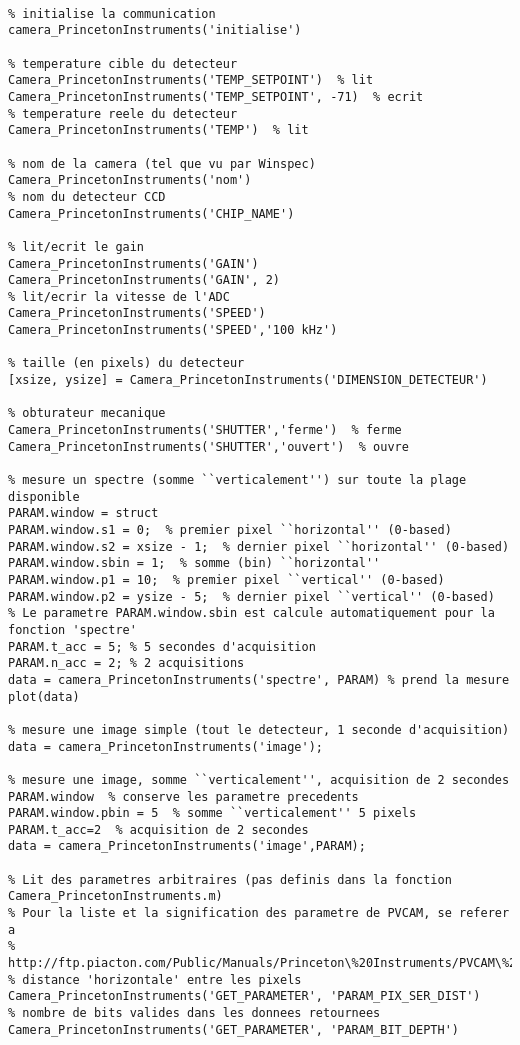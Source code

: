 \documentclass[11pt,francais]{book} %
\begin{document}
\begin{lstlisting}[frame=single,caption={Exemple d'utilisation des caméras Princeton Instruments avec Matlab},label={lst:excameraprincetoninstruments},breaklines=true,]  % Start your code-block

% initialise la communication
camera_PrincetonInstruments('initialise')

% temperature cible du detecteur
Camera_PrincetonInstruments('TEMP_SETPOINT')  % lit
Camera_PrincetonInstruments('TEMP_SETPOINT', -71)  % ecrit
% temperature reele du detecteur
Camera_PrincetonInstruments('TEMP')  % lit

% nom de la camera (tel que vu par Winspec)
Camera_PrincetonInstruments('nom')
% nom du detecteur CCD
Camera_PrincetonInstruments('CHIP_NAME')

% lit/ecrit le gain
Camera_PrincetonInstruments('GAIN')
Camera_PrincetonInstruments('GAIN', 2)
% lit/ecrir la vitesse de l'ADC
Camera_PrincetonInstruments('SPEED')
Camera_PrincetonInstruments('SPEED','100 kHz')

% taille (en pixels) du detecteur
[xsize, ysize] = Camera_PrincetonInstruments('DIMENSION_DETECTEUR')

% obturateur mecanique
Camera_PrincetonInstruments('SHUTTER','ferme')  % ferme
Camera_PrincetonInstruments('SHUTTER','ouvert')  % ouvre

% mesure un spectre (somme ``verticalement'') sur toute la plage disponible
PARAM.window = struct
PARAM.window.s1 = 0;  % premier pixel ``horizontal'' (0-based)
PARAM.window.s2 = xsize - 1;  % dernier pixel ``horizontal'' (0-based)
PARAM.window.sbin = 1;  % somme (bin) ``horizontal''
PARAM.window.p1 = 10;  % premier pixel ``vertical'' (0-based)
PARAM.window.p2 = ysize - 5;  % dernier pixel ``vertical'' (0-based)
% Le parametre PARAM.window.sbin est calcule automatiquement pour la fonction 'spectre'
PARAM.t_acc = 5; % 5 secondes d'acquisition
PARAM.n_acc = 2; % 2 acquisitions
data = camera_PrincetonInstruments('spectre', PARAM) % prend la mesure
plot(data)

% mesure une image simple (tout le detecteur, 1 seconde d'acquisition)
data = camera_PrincetonInstruments('image');

% mesure une image, somme ``verticalement'', acquisition de 2 secondes
PARAM.window  % conserve les parametre precedents
PARAM.window.pbin = 5  % somme ``verticalement'' 5 pixels
PARAM.t_acc=2  % acquisition de 2 secondes
data = camera_PrincetonInstruments('image',PARAM);

% Lit des parametres arbitraires (pas definis dans la fonction Camera_PrincetonInstruments.m)
% Pour la liste et la signification des parametre de PVCAM, se referer a
%  http://ftp.piacton.com/Public/Manuals/Princeton\%20Instruments/PVCAM\%202.7\%20Software\%20User\%20Manual.pdf
% distance 'horizontale' entre les pixels
Camera_PrincetonInstruments('GET_PARAMETER', 'PARAM_PIX_SER_DIST')
% nombre de bits valides dans les donnees retournees
Camera_PrincetonInstruments('GET_PARAMETER', 'PARAM_BIT_DEPTH')


\end{lstlisting}
\end{document}
